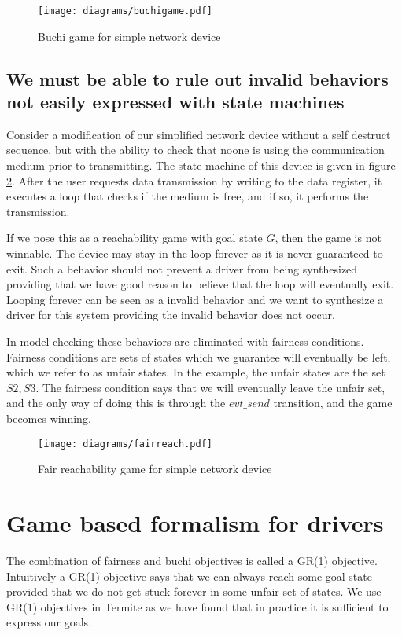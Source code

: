 \documentclass[a4paper,twoside,openright,11pt]{book}
\theoremstyle{definition}
\begin{document}
\begin{figure}[t]
\centering
\texttt{[image: diagrams/buchigame.pdf]}
\caption{Buchi game for simple network device}
\label{fig:buchi}
\end{figure}

\subsection{We must be able to rule out invalid behaviors not easily expressed with state machines}

Consider a modification of our simplified network device without a self destruct sequence, but with the ability to check that noone is using the communication medium prior to transmitting. The state machine of this device is given in figure \ref{fig:fair}. After the user requests data transmission by writing to the data register, it executes a loop that checks if the medium is free, and if so, it performs the transmission. 

If we pose this as a reachability game with goal state $G$, then the game is not winnable. The device may stay in the loop forever as it is never guaranteed to exit. Such a behavior should not prevent a driver from being synthesized providing that we have good reason to believe that the loop will eventually exit. Looping forever can be seen as a invalid behavior and we want to synthesize a driver for this system providing the invalid behavior does not occur. 

In model checking these behaviors are eliminated with fairness conditions. Fairness conditions are sets of states which we guarantee will eventually be left, which we refer to as unfair states. In the example, the unfair states are the set ${S2, S3}$. The fairness condition says that we will eventually leave the unfair set, and the only way of doing this is through the $evt\_send$ transition, and the game becomes winning.

\begin{figure}[t]
\centering
\texttt{[image: diagrams/fairreach.pdf]}
\caption{Fair reachability game for simple network device}
\label{fig:fair}
\end{figure}

\section{Game based formalism for drivers}

The combination of fairness and buchi objectives is called a GR(1) objective. Intuitively a GR(1) objective says that we can always reach some goal state provided that we do not get stuck forever in some unfair set of states. We use GR(1) objectives in Termite as we have found that in practice it is sufficient to express our goals.
\end{document}
